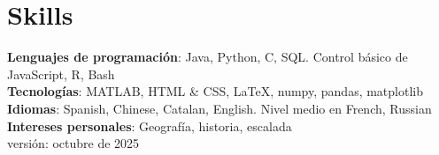 \documentclass[11pt,a4paper]{article}
\begin{document}
\section*{Skills}
\textbf{Lenguajes de programación}: Java, Python, C, SQL.  Control básico de JavaScript, R, Bash \\[2pt]
\textbf{Tecnologías}: MATLAB, HTML \& CSS, \LaTeX, numpy, pandas, matplotlib \\[2pt]
\textbf{Idiomas}: Spanish, Chinese, Catalan, English. Nivel medio en French, Russian \\[2pt]
\textbf{Intereses personales}: Geografía, historia, escalada \\[5pt]

    

    


\vfill
\noindent
\small versión: octubre de 2025
\end{document}

